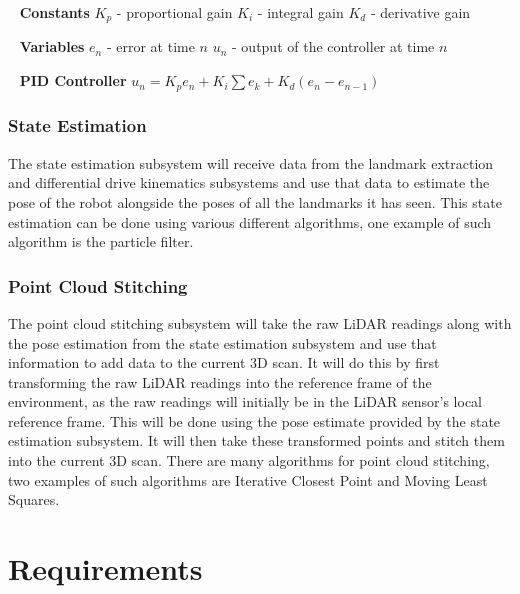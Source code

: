 \documentclass[12pt]{article}
\begin{document}
\ \newline
\textbf{Constants}
\newline $K_p$ - proportional gain
\newline $K_i$ - integral gain
\newline $K_d$ - derivative gain

\ \newline
\textbf{Variables}
\newline $e_n$ - error at time $n$
\newline $u_n$ - output of the controller at time $n$

\ \newline
\textbf{PID Controller}
\newline $u_n = K_p e_n + K_i \sum e_k + K_d (e_n - e_{n-1})$

\subsubsection{State Estimation}
The state estimation subsystem will receive data from the landmark extraction and differential drive kinematics
subsystems and use that data to estimate the pose of the robot alongside the poses of all the landmarks it has seen.
This state estimation can be done using various different algorithms, one example of such algorithm is the particle filter.

\subsubsection{Point Cloud Stitching}
The point cloud stitching subsystem will take the raw LiDAR readings along with the pose estimation from the state
estimation subsystem and use that information to add data to the current 3D scan.
\newline\newline
It will do this by first transforming the raw LiDAR readings into the reference frame of the environment, as the
raw readings will initially be in the LiDAR sensor's local reference frame. This will be done using the pose estimate
provided by the state estimation subsystem.
\newline\newline
It will then take these transformed points and stitch them into the current 3D scan. There are many algorithms for
point cloud stitching, two examples of such algorithms are Iterative Closest Point and Moving Least Squares.

\section{Requirements}
\label{sec_Requirements}
\end{document}

